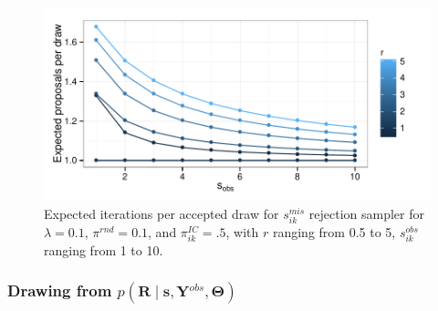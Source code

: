 \ifx\nofigures\undefined
\begin{figure}
\begin{center}
\includegraphics[width=.75\textwidth]{figures/proteomics/figure_nstates_sampler}
\end{center}
\caption{Expected iterations per accepted draw for $s_{ik}^{mis}$ rejection sampler for $\lambda=0.1$, $\pi^{rnd}=0.1$, and $\pi_{ik}^{IC}=.5$, with $r$ ranging from 0.5 to 5, $s_{ik}^{obs}$ ranging from 1 to 10. \label{proteomics:fig:s_ik^mis-Rejection-Sampler}}
\end{figure}
\fi

\subsubsection{Drawing from $p(\bm{R} \mid \bm s, \bm{Y}^{obs}, \bm{\Theta})$} \label{proteomics:sec:r_ik_mis_post}

